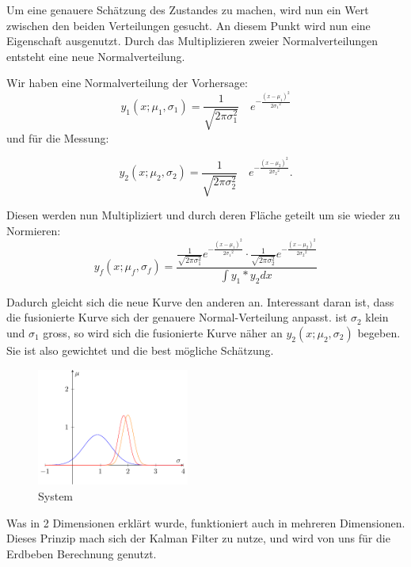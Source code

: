 Um eine genauere Schätzung des Zustandes zu machen, wird nun ein Wert zwischen den beiden Verteilungen gesucht. An diesem Punkt wird nun eine Eigenschaft ausgenutzt. Durch das Multiplizieren zweier Normalverteilungen entsteht eine neue Normalverteilung. 

Wir haben eine Normalverteilung der Vorhersage:
\begin{equation}
{y_1}(x;{\mu_1},{\sigma_1})=\frac{1}{\sqrt{2\pi\sigma_1^2}}\quad e^{-\frac{(x-{\mu_1})^2}{2{\sigma_1}^2}}
\end{equation} 
und für die Messung:

\begin{equation}
{y_2}(x;{\mu_2},{\sigma_2})=\frac{1}{\sqrt{2\pi\sigma_2^2}}\quad e^{-\frac{(x-{\mu_2})^2}{2{\sigma_2}^2}}.
\end{equation} 

Diesen werden nun Multipliziert und durch deren Fläche geteilt um sie wieder zu Normieren:
\begin{equation}
{y_f}(x;{\mu_f},{\sigma_f})=\frac{ \frac{1}{\sqrt{2\pi\sigma_1^2}}e^{-\frac{(x-{\mu_1})^2}{2{\sigma_1}^2}} \cdot \frac{1}{\sqrt{2\pi\sigma_2^2}}e^{-\frac{(x-{\mu_2})^2}{2{\sigma_2}^2}}}{\int {y_1}*{y_2} dx\,}
\end{equation} 

Dadurch gleicht sich die neue Kurve den anderen an. Interessant daran ist, dass die fusionierte Kurve sich der genauere Normal-Verteilung anpasst. ist ${\sigma_2}$ klein und ${\sigma_1}$ gross, so wird sich die fusionierte Kurve näher an ${y_2}(x;{\mu_2},{\sigma_2})$ begeben. Sie ist also gewichtet und die best mögliche Schätzung. 


\begin{figure}
 \begin{center}
 \includegraphics[width=5cm]{papers/erdbeben/Gausskurve3.pdf}
 \caption{System}
 \end{center}
\end{figure}

 
Was in 2 Dimensionen erklärt wurde, funktioniert auch in mehreren Dimensionen. Dieses Prinzip mach sich der Kalman Filter zu nutze, und wird von uns für die Erdbeben Berechnung genutzt. 





